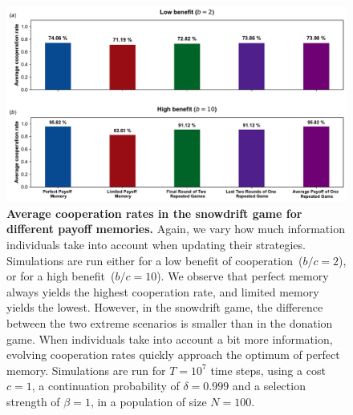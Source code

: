 \documentclass[11pt]{article}
\theoremstyle{plainCl1}
\theoremstyle{plainCl2}
\begin{document}
\begin{figure}[t]
  \centering
  \includegraphics[width=\textwidth]{static/snowdrift_game_more_memory.pdf}
  \caption{{\bf Average cooperation rates in the snowdrift game for different payoff memories.}
  Again, we vary how much information individuals take into account when updating their strategies.
  Simulations are run either for a low benefit of cooperation~($b/c\!=\!2$), or for a high benefit~($b/c\!=\!10$). 
  We observe that perfect memory always yields the highest cooperation rate, and limited memory yields the lowest.
  However, in the snowdrift game, the difference between the two extreme scenarios is smaller than in the donation game. 
  When individuals take into account a bit more information, evolving cooperation rates quickly approach the optimum of perfect memory. 
  Simulations are run for $T\!=\!10^7$ time steps, using a cost $c\!=\!1$, a continuation probability of $\delta\!=\!0.999$ and a selection strength of $\beta\!=\!1$, in a population of size $N\!=\!100$.}
\label{fig:cooperation_rate_all_updating_payoffs_snowdrift}
\end{figure}


\clearpage
\newpage

{
{\setlength{\bibsep}{0\baselineskip}


}}
\end{document}
